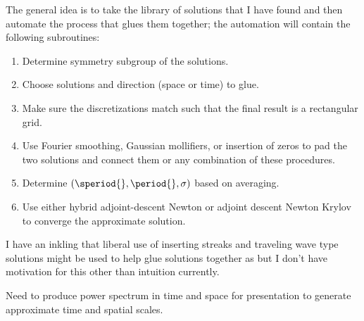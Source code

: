 \begin{description}
{\begin{description}
The general idea is to take the library of solutions that I have found
and then automate the process that glues them together; \ie
the automation will contain the following subroutines:
\begin{enumerate}
\item Determine symmetry subgroup of the solutions.
\item Choose solutions and direction (space or time) to glue.
\item Make sure the discretizations match such that the final result
is a rectangular grid.
\item Use Fourier smoothing, Gaussian mollifiers, or insertion of
zeros to pad the two solutions and connect them or any combination
of these procedures.
\item Determine $(\speriod{},\period{},\sigma)$ based on averaging.
\item Use either hybrid adjoint-descent Newton or adjoint descent
Newton Krylov to converge the approximate solution.
\end{enumerate}

I have an inkling that liberal use of inserting streaks and traveling
wave type solutions might be used to help glue solutions together as
but I don't have motivation for this other than intuition currently.

Need to produce power spectrum in time and space for presentation
to generate approximate time and spatial scales.

\end{description}
}




\end{description}
